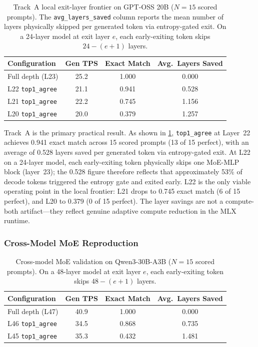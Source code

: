 \documentclass[11pt]{article}
\begin{document}
\begin{table}[t]
\centering
\small
\caption{Track~A local exit-layer frontier on GPT-OSS 20B ($N{=}15$ scored prompts). The \texttt{avg\_layers\_saved} column reports the mean number of layers physically skipped per generated token via entropy-gated exit. On a 24-layer model at exit layer $e$, each early-exiting token skips $24 - (e{+}1)$ layers.}
\label{tab:tracka}
\begin{tabular}{@{}lccc@{}}
\toprule
Configuration & Gen TPS & Exact Match & Avg.\ Layers Saved \\
\midrule
Full depth (L23) & 25.2 & 1.000 & 0.000 \\
L22 \texttt{top1\_agree} & 21.1 & 0.941 & 0.528 \\
L21 \texttt{top1\_agree} & 22.2 & 0.745 & 1.156 \\
L20 \texttt{top1\_agree} & 20.0 & 0.379 & 1.257 \\
\bottomrule
\end{tabular}
\end{table}

Track~A is the primary practical result. As shown in \cref{tab:tracka}, \texttt{top1\_agree} at Layer~22 achieves 0.941 exact match across 15 scored prompts (13 of 15 perfect), with an average of 0.528 layers saved per generated token via entropy-gated exit. At L22 on a 24-layer model, each early-exiting token physically skips one MoE-MLP block (layer~23); the 0.528 figure therefore reflects that approximately 53\% of decode tokens triggered the entropy gate and exited early. L22 is the only viable operating point in the local frontier: L21 drops to 0.745 exact match (6 of 15 perfect), and L20 to 0.379 (0 of 15 perfect). The layer savings are not a compute-both artifact---they reflect genuine adaptive compute reduction in the MLX runtime.

\subsubsection{Cross-Model MoE Reproduction}

\begin{table}[t]
\centering
\small
\caption{Cross-model MoE validation on Qwen3-30B-A3B ($N{=}15$ scored prompts). On a 48-layer model at exit layer $e$, each early-exiting token skips $48 - (e{+}1)$ layers.}
\label{tab:tracka_qwen3}
\begin{tabular}{@{}lccc@{}}
\toprule
Configuration & Gen TPS & Exact Match & Avg.\ Layers Saved \\
\midrule
Full depth (L47) & 40.9 & 1.000 & 0.000 \\
L46 \texttt{top1\_agree} & 34.5 & 0.868 & 0.735 \\
L45 \texttt{top1\_agree} & 35.3 & 0.432 & 1.481 \\
\bottomrule
\end{tabular}
\end{table}
\end{document}
